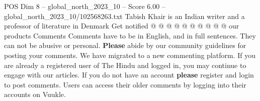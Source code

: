 \begin{textsample}{POS Dim 8 – global\_north\_2023\_10 – Score 6.00 – global\_north\_2023\_10/102568263.txt}
Tabish Khair is an Indian writer and a professor of literature in Denmark Get notified @ @ @ @ @ @ @ @ @ @ our products Comments Comments have to be in English, and in full sentences.
They can not be abusive or personal. \textbf{Please} abide by our community guidelines for posting your comments.
We have migrated to a new commenting platform.
If you are already a registered user of The Hindu and logged in, you may continue to engage with our articles.
If you do not have an account \textbf{please} register and login to post comments.
Users can access their older comments by logging into their accounts on Vuukle.

\end{textsample}
